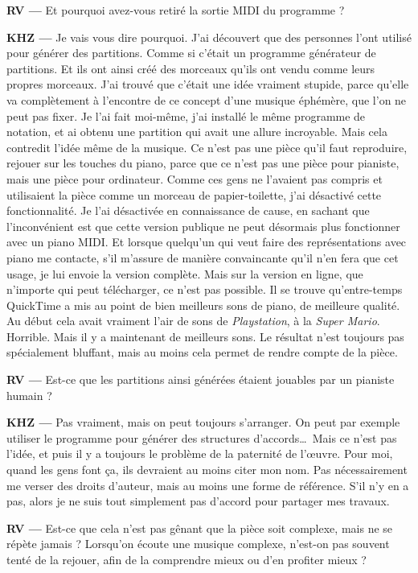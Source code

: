 \documentclass[a4paper,12pt]{article}
\begin{document}
\textbf{RV ---} Et pourquoi avez-vous retiré la sortie MIDI du programme ?

\textbf{KHZ ---} Je vais vous dire pourquoi. J'ai découvert que des personnes l'ont utilisé pour générer des partitions. Comme si c'était un programme générateur de partitions. Et ils ont ainsi créé des morceaux qu'ils ont vendu comme leurs propres morceaux. J'ai trouvé que c'était une idée vraiment stupide, parce qu'elle va complètement à l'encontre de ce concept d'une musique éphémère, que l'on ne peut pas fixer. Je l'ai fait moi-même, j'ai installé le même programme de notation, et ai obtenu une partition qui avait une allure incroyable. Mais cela contredit l'idée même de la musique. Ce n'est pas une pièce qu'il faut reproduire, rejouer sur les touches du piano, parce que ce n'est pas une pièce pour pianiste, mais une pièce pour ordinateur. Comme ces gens ne l'avaient pas compris et utilisaient la pièce comme un morceau de papier-toilette, j'ai désactivé cette fonctionnalité. Je l'ai désactivée en connaissance de cause, en sachant que l'inconvénient est que cette version publique ne peut désormais plus fonctionner avec un piano MIDI. Et lorsque quelqu'un qui veut faire des représentations avec piano me contacte, s'il m'assure de manière convaincante qu'il n'en fera que cet usage, je lui envoie la version complète. Mais sur la version en ligne, que n'importe qui peut télécharger, ce n'est pas possible. Il se trouve qu'entre-temps QuickTime a mis au point de bien meilleurs sons de piano, de meilleure qualité. Au début cela avait vraiment l'air de sons de \emph{Playstation}, à la \emph{Super Mario}. Horrible. Mais il y a maintenant de meilleurs sons. Le résultat n'est toujours pas spécialement bluffant, mais au moins cela permet de rendre compte de la pièce.

\textbf{RV ---} Est-ce que les partitions ainsi générées étaient jouables par un pianiste humain ?

\textbf{KHZ ---} Pas vraiment, mais on peut toujours s'arranger. On peut par exemple utiliser le programme pour générer des structures d'accords\dots~Mais ce n'est pas l'idée, et puis il y a toujours le problème de la paternité de l'œuvre. Pour moi, quand les gens font ça, ils devraient au moins citer mon nom. Pas nécessairement me verser des droits d'auteur, mais au moins une forme de référence. S'il n'y en a pas, alors je ne suis tout simplement pas d'accord pour partager mes travaux.

\textbf{RV ---} Est-ce que cela n'est pas gênant que la pièce soit complexe, mais ne se répète jamais ? Lorsqu'on écoute une musique complexe, n'est-on pas souvent tenté de la rejouer, afin de la comprendre mieux ou d'en profiter mieux ?
\end{document}
